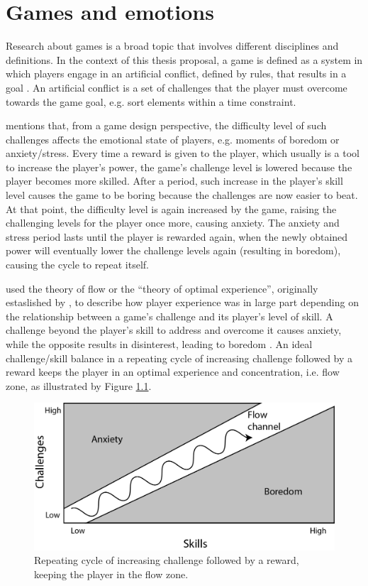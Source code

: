 \chapter{Games and emotions}
\label{ch:literature-games}

Research about games is a broad topic that involves different disciplines and definitions. In the context of this thesis proposal, a game is defined as a system in which players engage in an artificial conflict, defined by rules, that results in a goal \parencite{salen2004rules}. An artificial conflict is a set of challenges that the player must overcome towards the game goal, e.g. sort elements within a time constraint.

\textcite{schell2014art} mentions that, from a game design perspective, the difficulty level of such challenges affects the emotional state of players, e.g. moments of boredom or anxiety/stress. Every time a reward is given to the player, which usually is a tool to increase the player's power, the game's challenge level is lowered because the player becomes more skilled. After a period, such increase in the player's skill level causes the game to be boring because the challenges are now easier to beat. At that point, the difficulty level is again increased by the game, raising the challenging levels for the player once more, causing anxiety. The anxiety and stress period lasts until the player is rewarded again, when the newly obtained power will eventually lower the challenge levels again (resulting in boredom), causing the cycle to repeat itself.

\textcite{chen2007flow} used the theory of flow or the ``theory of optimal experience'', originally estaslished by \textcite{csikszentmihalyi1991flow}, to describe how player experience was in large part depending on the relationship between a game's challenge and its player's level of skill. A challenge beyond the player's skill to address and overcome it causes anxiety, while the opposite results in disinterest, leading to boredom \parencite{chen2007flow}. An ideal challenge/skill balance in a repeating cycle of increasing challenge followed by a reward keeps the player in an optimal experience and concentration, i.e. flow zone, as illustrated by Figure \ref{fig:flow-schell}.

\begin{figure}[h!]
    \centering
    \includegraphics[scale=0.8]{figures/flow-schell.png}
    \caption{Repeating cycle of increasing challenge followed by a reward, keeping the player in the flow zone. \parencite{schell2014art}}
    \label{fig:flow-schell}
\end{figure}


